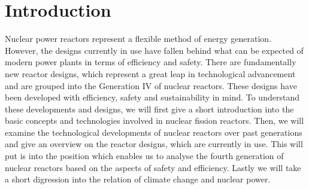 \chapter{Introduction}
Nuclear power reactors represent a flexible method of energy generation. However, the designs
currently in use have fallen behind what can be expected of modern power plants in terms
of efficiency and safety. There are fundamentally new reactor designs, which represent
a great leap in technological advancement and are grouped into the Generation IV of nuclear reactors.
These designs have been developed with efficiency, safety and sustainability in mind.
To understand these developments and designs, we will first give a short introduction into the
basic concepts and technologies involved in nuclear fission reactors. Then, we will examine the
technological developments of nuclear reactors over past generations and give an overview on
the reactor designs, which are currently in use.
This will put is into the position which enables us to analyse the fourth generation
of nuclear reactors based on the aspects of safety and efficiency.
Lastly we will take a short digression into the relation of climate change and nuclear power.